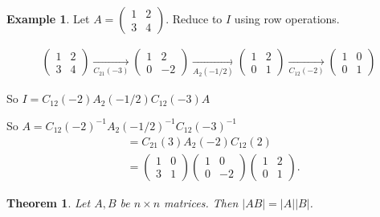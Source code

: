 \documentclass{article}
\newtheorem{theorem}{Theorem}
\theoremstyle{definition} \newtheorem*{definition}{Definition}
\newtheorem*{exmp}{Example} \newtheorem*{exmps}{Examples}
\begin{document}
  \begin{exmp}
    Let $A = \left( 
    \begin{matrix}
      1 & 2 \\
      3 & 4
    \end{matrix}
    \right)$. Reduce to $I$ using row operations.

\begin{align*}
  \left( 
\begin{matrix}
    1 & 2 \\
          3 & 4
\end{matrix}
\right) \underset{C_{21}(-3)}{\longrightarrow} \left( 
  \begin{matrix}
    1 & 2 \\
    0 & -2
  \end{matrix}
  \right) \underset{A_2(-1/2)}{\longrightarrow} \left( 
  \begin{matrix}
    1 & 2 \\
    0 & 1
  \end{matrix}
  \right) \underset{C_{12}(-2)}{\rightarrow} \left( 
  \begin{matrix}
    1 & 0 \\
    0 & 1
  \end{matrix}
  \right)
\end{align*}

So $I = C_{12}(-2)A_2(-1/2)C_{12}(-3)A$

So $A = C_{12}(-2)^{-1}A_2(-1/2)^{-1}C_{12}(-3)^{-1}$
\begin{align*}
  &= C_{21}(3)A_2(-2)C_{12}(2) \\
  &= 
  \left( 
\begin{matrix}
    1 & 0 \\
          3 & 1
\end{matrix}
  \right) \left( 
  \begin{matrix}
    1 & 0 \\
    0 & -2
  \end{matrix}
  \right) \left( 
  \begin{matrix}
    1 & 2 \\
    0 & 1
  \end{matrix}
  \right).
\end{align*}

  \end{exmp}

  \begin{theorem}
    Let $A,B$ be $n \times n$ matrices. Then $|AB| = |A||B|$.
    \label{thm:proddet}
  \end{theorem}
\end{document}
